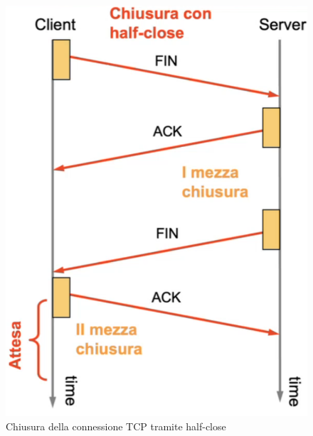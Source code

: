 \begin{figure}[h!]
    \centering
    \begin{minipage}{0.48\textwidth}
        \centering
        \includegraphics[width=\textwidth]{images/halfclosetcp.png}
        \caption{Chiusura della connessione TCP tramite half-close}
        \label{fig:halfclosetcp}
    \end{minipage}\hfill
    \begin{minipage}{0.48\textwidth}
        \centering

\end{minipage}
\end{figure}

